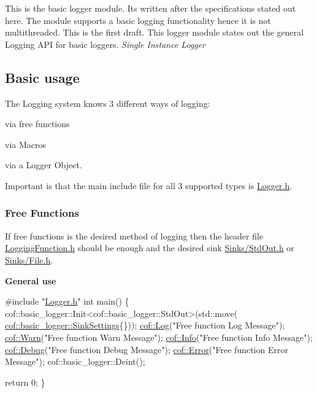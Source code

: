 This is the basic logger module. Its written after the specifications stated out here. The module supports a basic logging functionality hence it is not multithreaded. This is the first draft. This logger module states out the general Logging A\+PI for basic loggers. {\itshape Single Instance Logger}

\subsection*{Basic usage}

The Logging system knows 3 different ways of logging\+:


\begin{DoxyItemize}
\item via free functions
\item via Macros
\item via a Logger Object.
\end{DoxyItemize}

Important is that the main include file for all 3 supported types is {\ttfamily \hyperlink{_logger_8h}{Logger.\+h}}.

\subsubsection*{Free Functions}

If free functions is the desired method of logging then the header file {\ttfamily \hyperlink{_logging_function_8h}{Logging\+Function.\+h}} should be enough and the desired sink {\ttfamily \hyperlink{_std_out_8h}{Sinks/\+Std\+Out.\+h}} or {\ttfamily \hyperlink{_file_8h}{Sinks/\+File.\+h}}.

{\bfseries General use}


\begin{DoxyCode}
\textcolor{preprocessor}{#include "\hyperlink{_logger_8h}{Logger.h}"}
\textcolor{keywordtype}{int} main()
\{
    cof::basic\_logger::Init<cof::basic\_logger::StdOut>(std::move(
      \hyperlink{structcof_1_1basic__logger_1_1_sink_settings}{cof::basic\_logger::SinkSettings}\{\}));
    \hyperlink{_logging_function_8h_a1f56bcf4dd7901f39b3386261c75d4a5}{cof::Log}(\textcolor{stringliteral}{"Free function Log Message"});
    \hyperlink{_logging_function_8h_ac0c0af18a99bcd635fb89679890cdeaa}{cof::Warn}(\textcolor{stringliteral}{"Free function Warn Message"});
    \hyperlink{_logging_function_8h_a4d2fa4bc5cade7fdb692a0615b489997}{cof::Info}(\textcolor{stringliteral}{"Free function Info Message"});
    \hyperlink{_logging_function_8h_ac0fff05470889b9bf801966564dddb36}{cof::Debug}(\textcolor{stringliteral}{"Free function Debug Message"});
    \hyperlink{_logging_function_8h_a09fbfa2e340f6dff1804c2a19a7b34f4}{cof::Error}(\textcolor{stringliteral}{"Free function Error Message"});
    cof::basic\_logger::Deint();

    \textcolor{keywordflow}{return} 0;
\}
\end{DoxyCode}


